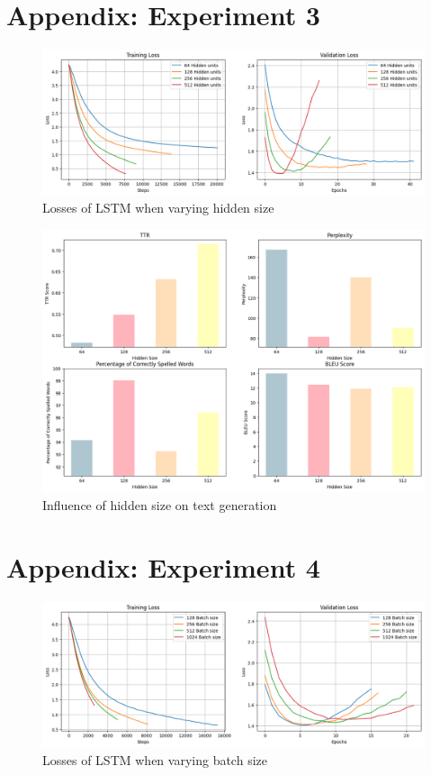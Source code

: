 \documentclass{article}
\begin{document}
\section*{Appendix: Experiment 3}
\begin{figure}[H]
    \centering
    \includegraphics[width=\linewidth]{figures/LSTM_hidden_sizes.png}
    \caption{Losses of LSTM when varying hidden size}
    \label{fig:loss_hidden}
\end{figure}

\begin{figure}[H]
    \centering
    \includegraphics[width=0.8\linewidth]{figures/text_hidden_size.png}
    \caption{Influence of hidden size on text generation}
    \label{fig:text_hidden}
\end{figure}

\section*{Appendix: Experiment 4}
\begin{figure}[H]
    \centering
    \includegraphics[width=\linewidth]{figures/LSTM_batch_size.png}
    \caption{Losses of LSTM when varying batch size}
    \label{fig:loss_batch}
\end{figure}
\end{document}
